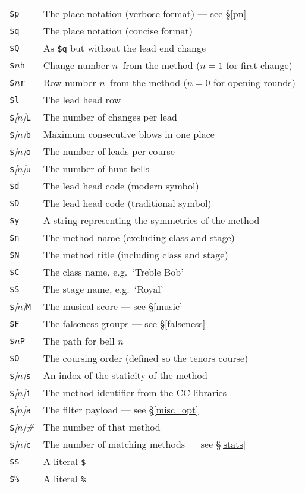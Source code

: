 \documentclass[a4paper,11pt,oneside]{book}
\makeatletter
\newcommand{\fspecd}[1]{\index{#1@{\hspace*{-\fspecwidth}\texttt{\$#1}}|ulink}}
\newcommand{\sref}[1]{\hyperref[#1]{\S\ref{#1}}}
\makeatother
\begin{document}
{\def\D{\texttt{\$}}\def\N{$n$\/}\def\No{\textit{[$n$]}\/}
\def\F#1{\texttt{#1}\fspecd{#1}}
\begin{tabularx}{\textwidth}{lX}
\D\F{p}&The place notation (verbose format) --- see \sref{pn}\\
\D\F{q}&The place notation (concise format)\\
\D\F{Q}&As \texttt{\$q} but without the lead end change%
  \index{place notation!printing|see{\texttt{\$p}, %
    \texttt{\$q} \textit{and} \texttt{\$Q}}}\\
\D\N\F{h}&Change number \N\ from the method ($n=1$ for first change)%
  \index{changes, printing|see{\texttt{\$h}}}\\
\D\N\F{r}&Row number \N\ from the method ($n=0$ for opening rounds)%
  \index{rows, printing|see{\texttt{\$r}}}\\
\D\F{l}&The lead head row%
  \index{lead head!printing|see{\texttt{\$l}}}\\
\D\No\F{L}&The number of changes per lead%
  \index{lead length!printing|see{\texttt{\$L}}}\\
\D\No\F{b}&Maximum consecutive blows in one place%
  \index{blows, maximum consecutive!printing|see{\texttt{\$b}}}\\
\D\No\F{o}&The number of leads per course\\
\D\No\F{u}&The number of hunt bells\\
\D\F{d}&The lead head code (modern symbol)\\
\D\F{D}&The lead head code (traditional symbol)
  \index{lead head!code|see{\texttt{\$d} \textit{and} \texttt{\$D}}}\\
\D\F{y}&A string representing the symmetries of the method%
  \index{symmetry!printing|see{\texttt{\$y}}}\\
\D\F{n}&The method name (excluding class and stage)\\
\D\F{N}&The method title (including class and stage)\\
\D\F{C}&The class name, e.g.\ `Treble Bob'%
  \index{class!printing name|see{\texttt{\$C}}}\\
\D\F{S}&The stage name, e.g.\ `Royal'%
  \index{stage!printing name|see{\texttt{\$S}}}\\
\D\No\F{M}&The musical score --- see \sref{music}\\
\D\F{F}&The falseness groups --- see \sref{falseness}\\
\D\N\F{P}&The path for bell \N\\
\D\F{O}&The coursing order (defined so the tenors course)\\
\D\No\F{s}&An index of the staticity of the method\\
\D\No\F{i}&The method identifier from the CC libraries\\
\D\No\F{a}&The filter payload --- see \sref{misc_opt}\\
\D\No\textit{\#}&The number of that method\\
\D\No\F{c}&The number of matching methods --- see \sref{stats}\\
\D\D&A literal \D\\
\D\texttt{\%}&A literal \texttt{\%}\\
\end{tabularx}}
\end{document}
